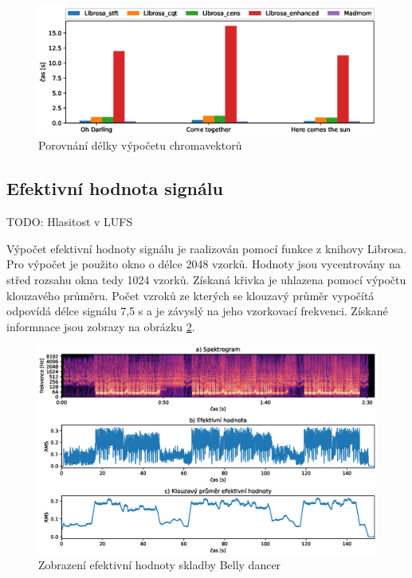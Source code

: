 \begin{figure}[H]
    \centering
    \includegraphics[width = 1\linewidth]{obrazky/Chroma_analysis_times_comparison.eps}
    \caption{Porovnání délky výpočetu chromavektorů}
    \label{fig:Chroma_calculation_time}
\end{figure}

    
\subsection{Efektivní hodnota signálu}
TODO: Hlasitost v LUFS

Výpočet efektivní hodnoty signálu je raalizován pomocí funkce z knihovy Librosa. Pro výpočet je použito okno o délce 2048 vzorků. Hodnoty jsou vycentrovány na střed rozsahu okna tedy 1024 vzorků. Získaná křivka je uhlazena pomocí výpočtu klouzavého průměru. Počet vzroků ze kterých se klouzavý průměr vypočítá odpovídá délce signálu 7,5 s a je závyslý na jeho vzorkovací frekvenci. Získané informnace jsou zobrazy na obrázku \ref{fig:RMS_calculation}.

\begin{figure}[H]
    \centering
    \includegraphics[width = 1\linewidth]{obrazky/Belly_dancer_RMS.eps}
    \caption{Zobrazení efektivní hodnoty skladby Belly dancer}
    \label{fig:RMS_calculation}
\end{figure}

